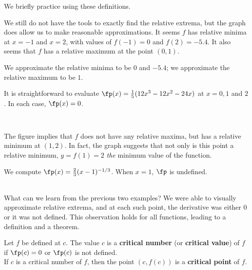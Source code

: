 \restoreboxwidth

We briefly practice using these definitions.\\

{We still do not have the tools to exactly find the relative extrema, but the graph does allow us to make reasonable approximations. It seems $f$ has relative minima at $x=-1$ and $x=2$, with values of $f(-1)=0$ and $f(2) = -5.4$. It also seems that $f$ has a relative maximum at the point $(0,1)$. 

We approximate the relative minima to be $0$ and $-5.4$; we approximate the relative maximum to be $1$.

It is straightforward to evaluate $\fp(x) =\frac15(12x^3-12x^2-24x)$ at $x=0, 1$ and $2$. In each case, $\fp(x) = 0$. 
}\\

{The figure implies that $f$ does not have any relative maxima, but has a relative minimum at $(1,2)$. In fact, the graph suggests that not only is this point a relative minimum, $y=f(1)=2$ \textit{the} minimum value of the function.

We compute $\fp(x) = \frac23(x-1)^{-1/3}$. When $x=1$, $\fp$ is undefined.}\\

What can we learn from the previous two examples? We were able to visually approximate relative extrema, and at each such point, the derivative was either 0 or it was not defined. This observation holds for all functions, leading to a definition and a theorem.

%
{Let $f$ be defined at $c$. The value $c$ is a \textbf{critical number} (or \textbf{critical value}) of $f$ if $\fp(c)=0$ or $\fp(c)$ is not defined. \\

If $c$ is a critical number of $f$, then the point $(c,f(c))$ is a \textbf{critical point} of $f$.
}

